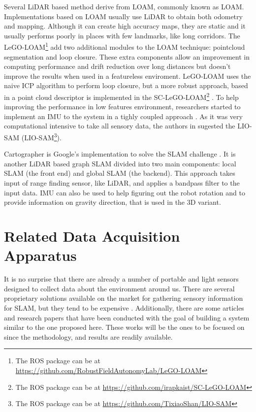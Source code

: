 Several \acs*{LiDAR} based method derive from \acl*{LOAM}, commonly known as \acs*{LOAM}. Implementations based on \acs*{LOAM} usually use \acs*{LiDAR} to obtain both odometry and mapping. Although it can create high accuracy maps, they are static and it usually performs poorly in places with few landmarks, like long corridors. The LeGO-LOAM\footnote{The \acs*{ROS} package can be at \url{https://github.com/RobustFieldAutonomyLab/LeGO-LOAM}} add two additional modules to the \acs*{LOAM} technique: pointcloud segmentation and loop closure. These extra components allow an improvement in computing performance and drift reduction over long distances but doesn't improve the results when used in a featureless enviroment. LeGO-LOAM uses the naive \acs*{ICP} algorithm to perform loop closure, but a more robust approach, based in a point cloud descriptor is implemented in the SC-LeGO-LOAM\footnote{The \acs*{ROS} package can be at \url{https://github.com/irapkaist/SC-LeGO-LOAM}} \cite{kim_scan_2018}. To help improving the performance in low features environment, researchers started to implement an \acs*{IMU} to the system in a tighly coupled approach \cite{ye2019tightly, xu_fast-lio_2021,xu_fast-lio2_2021}. As it was very computational intensive to take all sensory data, the authors in \cite{liosam2020shan} sugested the \acl*{LIO-SAM} (\acs*{LIO-SAM}\footnote{The \acs*{ROS} package can be at \url{https://github.com/TixiaoShan/LIO-SAM}}).

Cartographer is Google's implementation to solve the \acs*{SLAM} challenge \cite{hess_real-time_2016}. It is another \acs*{LiDAR} based graph \acs*{SLAM} divided into two main components: local \acs*{SLAM} (the front end) and global \acs*{SLAM} (the backend). This approach takes input of range finding sensor, like \acs*{LiDAR}, and applies a bandpass filter to the input data. \acs*{IMU} can also be used to help figuring out the robot rotation and to provide information on gravity direction, that is used in the 3D variant.
 
\section{Related Data Acquisition Apparatus}

It is no surprise that there are already a number of portable and light sensors designed to collect data about the environment around us. There are several proprietary solutions available on the market for gathering sensory information for \acs*{SLAM}, but they tend to be expensive \cite{libackpack_C50, libackpack_DGC50}. Additionally, there are some articles and research papers that have been conducted with the goal of building a system similar to the one proposed here. These works will be the ones to be focused on since the methodology, and results are readily available.

